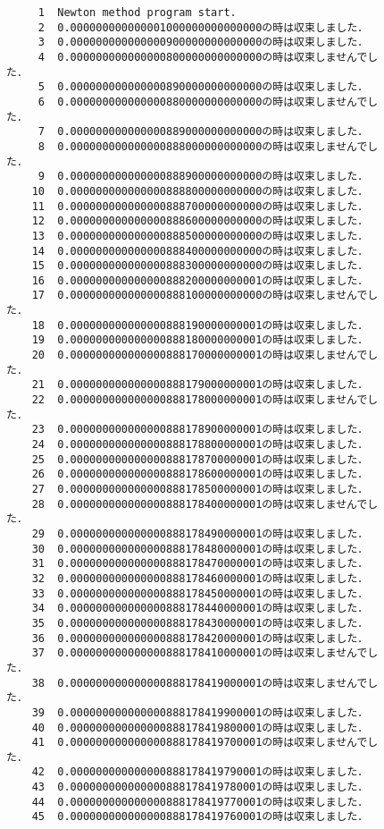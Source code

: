 \documentclass[12pt]{jarticle}
\begin{document}
\begin{figure}[t]
\begin{screen}
\small
\begin{verbatim}
     1	Newton method program start.
     2	0.000000000000001000000000000000の時は収束しました．
     3	0.000000000000000900000000000000の時は収束しました．
     4	0.000000000000000800000000000000の時は収束しませんでした．
     5	0.000000000000000890000000000000の時は収束しました．
     6	0.000000000000000880000000000000の時は収束しませんでした．
     7	0.000000000000000889000000000000の時は収束しました．
     8	0.000000000000000888000000000000の時は収束しませんでした．
     9	0.000000000000000888900000000000の時は収束しました．
    10	0.000000000000000888800000000000の時は収束しました．
    11	0.000000000000000888700000000000の時は収束しました．
    12	0.000000000000000888600000000000の時は収束しました．
    13	0.000000000000000888500000000000の時は収束しました．
    14	0.000000000000000888400000000000の時は収束しました．
    15	0.000000000000000888300000000000の時は収束しました．
    16	0.000000000000000888200000000001の時は収束しました．
    17	0.000000000000000888100000000000の時は収束しませんでした．
    18	0.000000000000000888190000000001の時は収束しました．
    19	0.000000000000000888180000000001の時は収束しました．
    20	0.000000000000000888170000000001の時は収束しませんでした．
    21	0.000000000000000888179000000001の時は収束しました．
    22	0.000000000000000888178000000001の時は収束しませんでした．
    23	0.000000000000000888178900000001の時は収束しました．
    24	0.000000000000000888178800000001の時は収束しました．
    25	0.000000000000000888178700000001の時は収束しました．
    26	0.000000000000000888178600000001の時は収束しました．
    27	0.000000000000000888178500000001の時は収束しました．
    28	0.000000000000000888178400000001の時は収束しませんでした．
    29	0.000000000000000888178490000001の時は収束しました．
    30	0.000000000000000888178480000001の時は収束しました．
    31	0.000000000000000888178470000001の時は収束しました．
    32	0.000000000000000888178460000001の時は収束しました．
    33	0.000000000000000888178450000001の時は収束しました．
    34	0.000000000000000888178440000001の時は収束しました．
    35	0.000000000000000888178430000001の時は収束しました．
    36	0.000000000000000888178420000001の時は収束しました．
    37	0.000000000000000888178410000001の時は収束しませんでした．
    38	0.000000000000000888178419000001の時は収束しませんでした．
    39	0.000000000000000888178419900001の時は収束しました．
    40	0.000000000000000888178419800001の時は収束しました．
    41	0.000000000000000888178419700001の時は収束しませんでした．
    42	0.000000000000000888178419790001の時は収束しました．
    43	0.000000000000000888178419780001の時は収束しました．
    44	0.000000000000000888178419770001の時は収束しました．
    45	0.000000000000000888178419760001の時は収束しました．
\end{verbatim}
\end{screen}
\end{figure}
\end{document}

